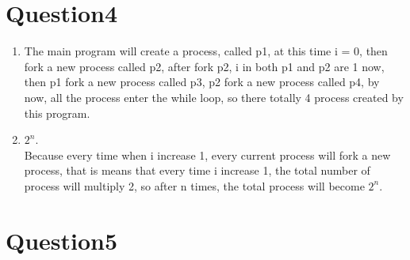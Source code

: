 \documentclass[a4paper,12pt]{article}
\begin{document}
\section*{Question4}
\begin{enumerate}
\item The main program will create a process, called p1, at this time i = 0, then fork a new process called p2, after fork p2, i in both p1 and p2 are 1 now, then p1 fork a new process called p3, p2 fork a new process called p4, by now, all the process enter the while loop, so there totally 4 process created by this program.
\item $2^n$.\\ Because every time when i increase 1, every current process will fork a new process, that is means that every time i increase 1, the total number of process will multiply 2, so after n times, the total process will become $2^n$.
\end{enumerate}
\section*{Question5}
\end{document}
